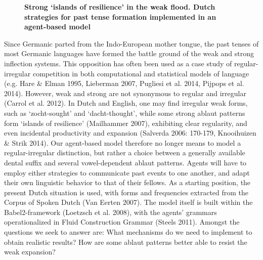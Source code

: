 \documentclass[10pt, a4paper, twopage, headinclude, footinclude, BCOR5mm]{book}
\begin{document}
\newpage

\begin{figure}[t!]
\centering
\large\textbf{Strong ‘islands of resilience’ in the weak flood. Dutch strategies for past tense formation implemented in an agent-based model}
\vspace*{0.5cm}
\end{figure}


\begin{table}[t!]
\end{table} 
\noindent
Since Germanic parted from the Indo-European mother tongue, the past tenses of most Germanic languages have formed the battle ground of the weak and strong inflection systems. This opposition has often been used as a case study of regular-irregular competition in both computational and statistical models of language (e.g. Hare \& Elman 1995, Lieberman 2007, Pugliesi et al. 2014, Pijpops et al. 2014). However, weak and strong are not synonymous to regular and irregular (Carrol et al. 2012). In Dutch and English, one may find irregular weak forms, such as `zocht-sought' and `dacht-thought', while some strong ablaut patterns form ‘islands of resilience’ (Mailhammer 2007), exhibiting clear regularity, and even incidental productivity and expansion (Salverda 2006: 170-179, Knooihuizen \& Strik 2014).  Our agent-based model therefore no longer means to model a regular-irregular distinction, but rather a choice between a generally available dental suffix and several vowel-dependent ablaut patterns. Agents will have to employ either strategies to communicate past events to one another, and adapt their own linguistic behavior to that of their fellows. As a starting position, the present Dutch situation is used, with forms and frequencies extracted from the Corpus of Spoken Dutch (Van Eerten 2007). The model itself is built within the Babel2-framework (Loetzsch et al. 2008), with the agents’ grammars operationalized in Fluid Construction Grammar (Steels 2011). Amongst the questions we seek to answer are: What mechanisms do we need to implement to obtain realistic results? How are some ablaut patterns better able to resist the weak expansion?  
\end{document}
